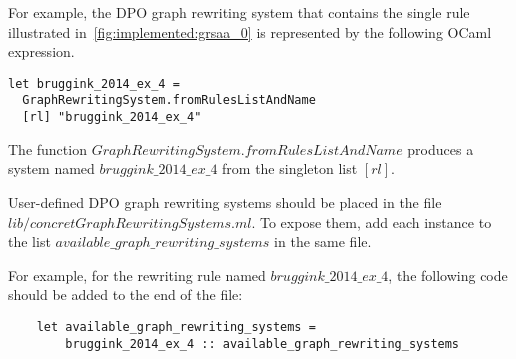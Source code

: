 For example, the DPO graph rewriting system that contains the single rule illustrated in~\autoref{fig:implemented:grsaa_0} is represented by the following OCaml expression. 
\begin{verbatim}
let bruggink_2014_ex_4 =
  GraphRewritingSystem.fromRulesListAndName 
  [rl] "bruggink_2014_ex_4"
\end{verbatim}
The function \colorbox{Ivory2}{$GraphRewritingSystem.fromRulesListAndName$} produces a system named \colorbox{Ivory2}{$bruggink\_2014\_ex\_4$} from the singleton list \colorbox{Ivory2}{$[rl]$}.


User-defined DPO graph rewriting systems should be placed in the file \colorbox{Ivory2}{$lib/concretGraphRewritingSystems.ml$}. To expose them, add each instance to the list \colorbox{Ivory2}{$available\_graph\_rewriting\_systems$} in the same file.

For example, for the rewriting rule named \colorbox{Ivory2}{$bruggink\_2014\_ex\_4$}, the following code should be added to the end of the file:
\begin{verbatim}
    let available_graph_rewriting_systems = 
        bruggink_2014_ex_4 :: available_graph_rewriting_systems 
\end{verbatim}

